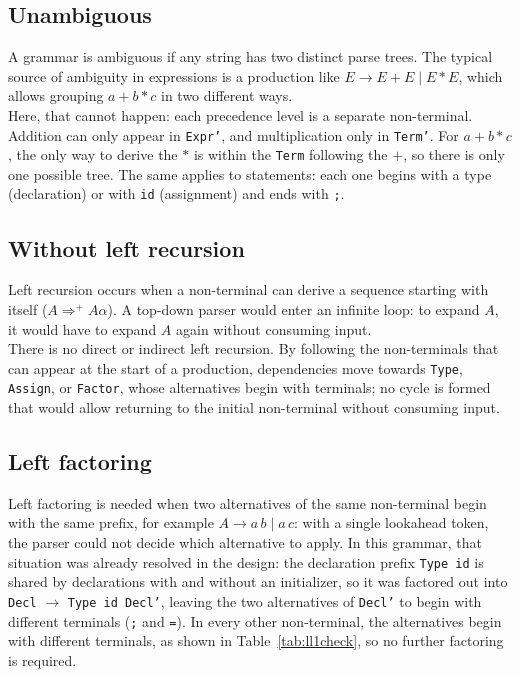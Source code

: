 \documentclass[12pt,letterpaper]{article}
\begin{document}
\subsection{Unambiguous}

A grammar is ambiguous if any string has two distinct parse trees. The typical source of ambiguity in expressions is a production like $E \rightarrow E + E \mid E * E$, which allows grouping $a + b * c$ in two different ways.\\

Here, that cannot happen: each precedence level is a separate non-terminal. Addition can only appear in \texttt{Expr'}, and multiplication only in \texttt{Term'}. For $a + b * c$, the only way to derive the $*$ is within the \texttt{Term} following the $+$, so there is only one possible tree. The same applies to statements: each one begins with a type (declaration) or with \texttt{id} (assignment) and ends with \texttt{;}.
\newpage

\subsection{Without left recursion}
Left recursion occurs when a non-terminal can derive a sequence starting with itself ($A \Rightarrow^+ A \alpha$). A top-down parser would enter an infinite loop: to expand $A$, it would have to expand $A$ again without consuming input.\\

There is no direct or indirect left recursion. By following the non-terminals that can appear at the start of a production, dependencies move towards \texttt{Type}, \texttt{Assign}, or \texttt{Factor}, whose alternatives begin with terminals; no cycle is formed that would allow returning to the initial non-terminal without consuming input.

\subsection{Left factoring}
Left factoring is needed when two alternatives of the same non-terminal begin with the same prefix, for example $A \rightarrow a\,b \mid a\,c$: with a single lookahead token, the parser could not decide which alternative to apply. In this grammar, that situation was already resolved in the design: the declaration prefix \texttt{Type id} is shared by declarations with and without an initializer, so it was factored out into \texttt{Decl} $\rightarrow$ \texttt{Type id Decl'}, leaving the two alternatives of \texttt{Decl'} to begin with different terminals (\texttt{;} and \texttt{=}). In every other non-terminal, the alternatives begin with different terminals, as shown in Table~\ref{tab:ll1check}, so no further factoring is required.
\end{document}
